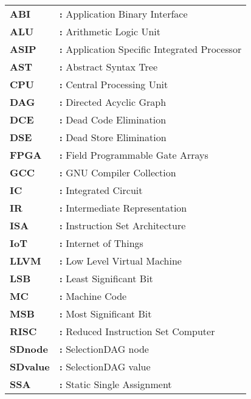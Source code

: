 \begin{tabular}{@{}p{2cm}l}
{\bf{ABI}} & {\bf:} Application Binary Interface\\
{\bf ALU} & {\bf:} Arithmetic Logic Unit\\
{\bf ASIP} & {\bf:} Application Specific Integrated Processor\\
{\bf AST} & {\bf:} Abstract Syntax Tree\\
{\bf CPU} & {\bf:} Central Processing Unit\\
{\bf DAG} & {\bf:} Directed Acyclic Graph\\
{\bf DCE} & {\bf:} Dead Code Elimination\\
{\bf DSE} & {\bf:} Dead Store Elimination\\
{\bf FPGA} & {\bf:} Field Programmable Gate Arrays\\
{\bf GCC} & {\bf:} GNU Compiler Collection\\
{\bf IC} & {\bf:} Integrated Circuit\\
{\bf IR} & {\bf:} Intermediate Representation\\
{\bf ISA} & {\bf:} Instruction Set Architecture\\
{\bf IoT} & {\bf:} Internet of Things\\
{\bf LLVM} & {\bf:} Low Level Virtual Machine\\
{\bf LSB} & {\bf:} Least Significant Bit\\
{\bf MC} & {\bf:} Machine Code\\
{\bf MSB} & {\bf:} Most Significant Bit\\
{\bf RISC} & {\bf:} Reduced Instruction Set Computer\\
{\bf SDnode} & {\bf:} SelectionDAG node\\
{\bf SDvalue} & {\bf:} SelectionDAG value\\
{\bf SSA} & {\bf:} Static Single Assignment\\
\end{tabular}


